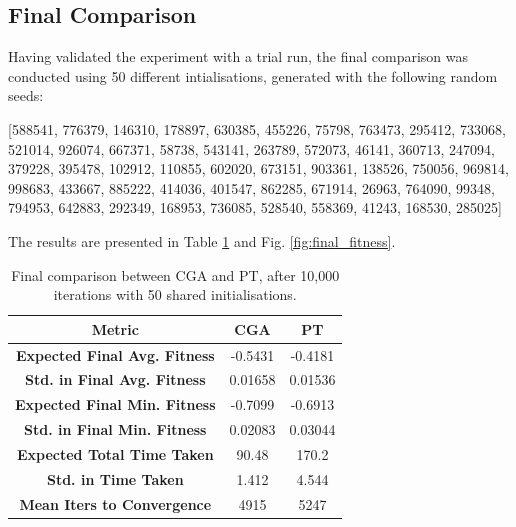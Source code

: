 \documentclass[10pt]{article}
\begin{document}
\begin{multicols}{2}
\subsection{Final Comparison}
Having validated the experiment with a trial run, the final comparison was conducted using 50 different intialisations, generated with the following random seeds:

[588541, 776379, 146310, 178897, 630385, 455226, 75798, 763473, 295412, 733068, 521014, 926074, 667371, 58738, 543141, 263789, 572073, 46141, 360713, 247094, 379228, 395478, 102912, 110855, 602020, 673151, 903361, 138526, 750056, 969814, 998683, 433667, 885222, 414036, 401547, 862285, 671914, 26963, 764090, 99348, 794953, 642883, 292349, 168953, 736085, 528540, 558369, 41243, 168530, 285025]

The results are presented in Table \ref{tab:final_comparison} and Fig. \ref{fig:final_fitness}. 

\begin{table}[H]
    \centering\hspace{-2mm}
    \begin{tabular}{|c|c|c|}
    \hline
    \textbf{Metric} & \textbf{CGA} & \textbf{PT} \\
    \hline
    \textbf{Expected Final Avg. Fitness} & -0.5431 & -0.4181 \\
    \textbf{Std. in Final Avg. Fitness} & 0.01658 & 0.01536 \\
    \hline
    \cellcolor{lightgray}\textbf{Expected Final Min. Fitness} &\cellcolor{lightgray} -0.7099 &\cellcolor{lightgray} -0.6913 \\
    \cellcolor{lightgray}\textbf{Std. in Final Min. Fitness} &\cellcolor{lightgray} 0.02083 &\cellcolor{lightgray} 0.03044 \\
    \hline
    \textbf{Expected Total Time Taken} & 90.48 & 170.2 \\
    \textbf{Std. in Time Taken} & 1.412 & 4.544 \\
    \hline
    \cellcolor{lightgray}\textbf{Mean Iters to Convergence} &\cellcolor{lightgray} 4915 &\cellcolor{lightgray} 5247 \\
    \hline
    \end{tabular}
    \captionsetup{justification=centering}
    \caption{Final comparison between CGA and PT, after 10,000 iterations with 50 shared initialisations.}
    \label{tab:final_comparison}
\end{table}


\end{multicols}
\end{document}
